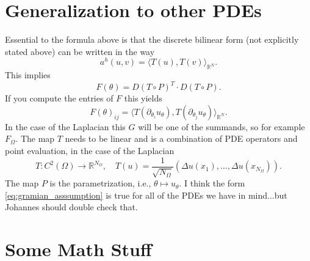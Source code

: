 \documentclass[11pt]{article}
\theoremstyle{definition}
\theoremstyle{plain}
\newtheorem{lemma}[definition]{Lemma}
\begin{document}
\section{Generalization to other PDEs}
Essential to the formula above is that the discrete bilinear form (not explicitly stated above) can be written in the way
\begin{equation}\label{eq:gramian_asssumption}
    a^h(u,v) 
    =
    \langle T(u), T(v) \rangle_{\mathbb R^N}.
\end{equation}
This implies 
\begin{equation*}
    F(\theta) = D(T\circ P)^T \cdot D(T \circ P).
\end{equation*}
If you compute the entries of $F$ this yields
\begin{equation*}
    F(\theta)_{ij} = \langle T(\partial_{\theta_i}u_\theta), T(\partial_{\theta_j}u_\theta) \rangle_{\mathbb R^N}.
\end{equation*}
In the case of the Laplacian this $G$ will be one of the summands, so for example $F_\Omega$. The map $T$ needs to be linear and is a combination of PDE operators and point evaluation, in the case of the Laplacian
\begin{equation*}
    T:C^2(\Omega) \to \mathbb R^{N_\Omega}, \quad T(u) = \frac{1}{\sqrt{N_{\Omega}}}(\Delta u(x_1), \dots, \Delta u(x_{N_{\Omega}})).
\end{equation*}
The map $P$ is the parametrization, i.e., $\theta\mapsto u_\theta$.
I think the form \eqref{eq:gramian_asssumption} is true for all of the PDEs we have in mind...but Johannes should double check that.

\section{Some Math Stuff}




\end{document}
